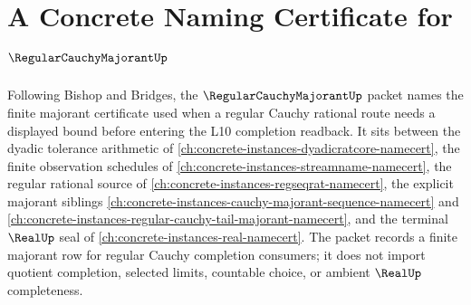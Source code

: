 \chapter{A Concrete Naming Certificate for $\RegularCauchyMajorantUp$}
\label{ch:concrete-instances-regular-cauchy-majorant-namecert}

Following Bishop and Bridges, the $\RegularCauchyMajorantUp$ packet names the finite majorant certificate used when a regular Cauchy rational route needs a displayed bound before entering the L10 completion readback. It sits between the dyadic tolerance arithmetic of \autoref{ch:concrete-instances-dyadicratcore-namecert}, the finite observation schedules of \autoref{ch:concrete-instances-streamname-namecert}, the regular rational source of \autoref{ch:concrete-instances-regseqrat-namecert}, the explicit majorant siblings \autoref{ch:concrete-instances-cauchy-majorant-sequence-namecert} and \autoref{ch:concrete-instances-regular-cauchy-tail-majorant-namecert}, and the terminal $\RealUp$ seal of \autoref{ch:concrete-instances-real-namecert}. The packet records a finite majorant row for regular Cauchy completion consumers; it does not import quotient completion, selected limits, countable choice, or ambient $\RealUp$ completeness.

